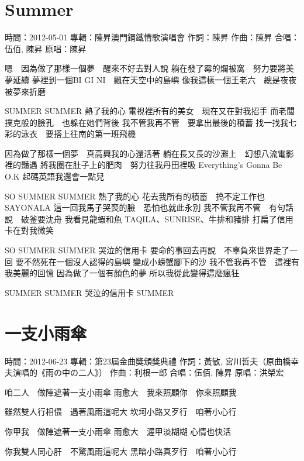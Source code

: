 \documentclass[UTF8,a4paper,oneside,twocolumn,12pt]{ctexbook}
\newcommand{\infopair}[2]{\textbullet #1：#2}
\newcommand{\zc}[1][伍佰]{\infopair{作詞}{#1}}
\newcommand{\zq}[1][伍佰]{\infopair{作曲}{#1}}
\newcommand{\zj}[1]{\infopair{專輯}{#1}}
\newcommand{\yc}[1]{\infopair{原唱}{#1}}
\newcommand{\sj}[1]{\infopair{時間}{#1}}
\newenvironment{info}{\begin{flushleft}\kaishu
	}
	{\end{flushleft}\normalsize\yahei\par}
\newenvironment{lyric}{
	}
{}
\begin{document}
\section{Summer}%
\begin{info}
	\sj{2012-05-01}
	\zj{陳昇澳門鋼鐵情歌演唱會}
	\zc[陳昇]
	\zq[陳昇]
	\infopair{合唱}{伍佰, 陳昇}
	\yc{陳昇}
\end{info}
\begin{lyric}
	嗯　因為做了那樣一個夢　醒來不好去對人說
	躺在發了霉的爛被窩　努力要將美夢延續
	夢裡到一個BI GI NI　飄在天空中的島嶼
	像我這樣一個王老六　總是夜夜被夢來折磨

	SUMMER SUMMER 熱了我的心
	電視裡所有的美女　現在又在對我招手
	而老闆撲克般的臉孔　也躲在她們背後
	我不管我再不管　要拿出最後的積蓄
	找一找我七彩的泳衣　要搭上往南的第一班飛機

	因為做了那樣一個夢　真高興我的心還活著
	躺在長又長的沙灘上　幻想八流電影裡的豔遇
	將我圈在肚子上的肥肉　努力往我丹田裡吸
	Everything's Gonna Be O.K
	起碼英語我還會一點兒

	SO SUMMER SUMMER 熱了我的心
	花去我所有的積蓄　搞不定工作也 SAYONALA
	這一回我馬子哭喪的臉　恐怕也就此永別
	我不管我再不管　有句話說　破釜要沈舟
	我看見龍蝦和魚 TAQILA、SUNRISE、牛排和豬排
	打扁了信用卡在對我微笑

	SO SUMMER SUMMER 哭泣的信用卡
	要命的事回去再說　不辜負來世界走了一回
	要不然死在一個沒人認得的島嶼
	變成小螃蟹腳下的沙
	我不管我再不管　這裡有我美麗的回憶
	因為做了一個有顏色的夢
	所以我從此變得這麼瘋狂

	SUMMER
	SUMMER 哭泣的信用卡
	SUMMER
\end{lyric}

\section{一支小雨傘}%
\begin{info}
	\sj{2012-06-23}
	\zj{第23屆金曲獎頒獎典禮}
	\zc[黃敏, 宮川哲夫（原曲橋幸夫演唱的《雨の中の二人》）]
	\zq[利根一郎]
	\infopair{合唱}{伍佰, 陳昇}
	\yc{洪榮宏}
\end{info}
\begin{lyric}%
	咱二人　做陣遮著一支小雨傘
	雨愈大　我來照顧你　你來照顧我

	雖然雙人行相偎　遇著風雨這呢大
	坎坷小路又歹行　咱著小心行

	你甲我　做陣遮著一支小雨傘
	雨愈大　渥甲淡糊糊 心情也快活

	你我雙人同心肝　不驚風雨這呢大
	黑暗小路真歹行　咱著小心行
\end{lyric}
\end{document}
